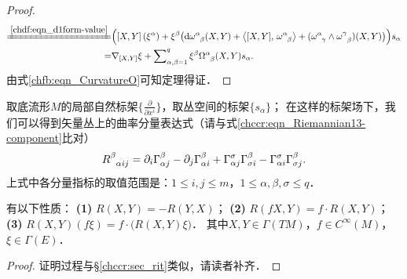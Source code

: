 \begin{proof}
\begin{align*}
   \xlongequal{\ref{chdf:eqn_d1form-value}}&\Bigl( \left[X,Y\right](\xi^\alpha)
   +\xi^\beta \bigl( \mathrm{d}\omega_{\hphantom{\alpha}\beta}^\alpha (X,Y)
   +\left< [X,Y],\, \omega_{\hphantom{\alpha}\beta}^\alpha\right> 
   + (\omega_{\hphantom{\alpha}\gamma}^\alpha \wedge \omega_{\hphantom{\alpha}\beta}^\gamma)(X,Y)
    \bigr)  \Bigr)s_\alpha  \\
   =&\nabla_{[X,Y]} \xi + \sum\nolimits_{\alpha,\beta=1}^{q} 
   \xi^\beta \Omega_{\hphantom{\alpha}\beta}^\alpha (X,Y) s_\alpha .
\end{align*} \setlength{\mathindent}{2em}
由式\eqref{chfb:eqn_CurvatureO}可知定理得证．
\end{proof}



取底流形$M$的局部自然标架$\{\frac{\partial }{\partial x^i}\}$，取丛空间的标架$\{s_\alpha\}$；
在这样的标架场下，我们可以得到矢量丛上的曲率分量表达式（请与式\eqref{chccr:eqn_Riemannian13-component}比对）
\begin{equation}\label{chfb:eqn_R-vector-bundle}
    R_{\hphantom{\alpha}\alpha i j}^\beta = {\partial_i} \Gamma_{\alpha j}^{\beta} -\partial_j \Gamma_{\alpha i}^{\beta}
    +\Gamma_{\alpha j}^{\sigma} \Gamma_{\sigma i}^{\beta} -  \Gamma_{\alpha i}^{\sigma}\Gamma_{\sigma j}^{\beta} .   
\end{equation}
上式中各分量指标的取值范围是：$ 1\leqslant i,j \leqslant m $，$ 1\leqslant \alpha,\beta,\sigma \leqslant q$．


\begin{theorem}
    有以下性质：
    {\bfseries (1)} $R(X, Y)=-R(Y, X)$；
    {\bfseries (2)} $R(f X, Y)=f \cdot R(X, Y)$；
    {\bfseries (3)} $R(X, Y)(f \xi)=f \cdot\bigl(R(X, Y) \xi\bigr)$．
    其中$X, Y \in \Gamma(TM)$，$ f \in C^{\infty}(M)$，$ \xi \in \Gamma(E)$．
\end{theorem}
\begin{proof}
    证明过程与\S\ref{chccr:sec_rit}类似，请读者补齐．
\end{proof}


